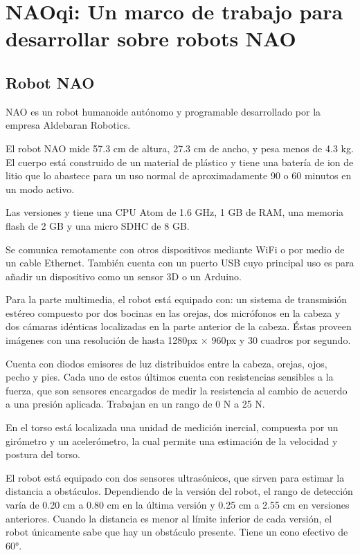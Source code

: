 \section{NAOqi: Un marco de trabajo para desarrollar sobre robots NAO}
\label{\detokenize{chapter_one/naoqi:naoqi-un-marco-de-trabajo-para-desarrollar-sobre-robots-nao}}\label{\detokenize{chapter_one/naoqi::doc}}


\subsection{Robot NAO}
\label{\detokenize{chapter_one/naoqi:nao}}
NAO es un robot humanoide autónomo y programable desarrollado por la empresa Aldebaran Robotics.

El robot NAO mide 57.3 cm de altura, 27.3 cm de ancho, y pesa menos de 4.3 kg.
El cuerpo está construido de un material de plástico y tiene una batería de ion
de litio que lo abastece para un uso normal de aproximadamente
90 o 60 minutos en un modo activo.

Las versiones  y  tiene una CPU Atom de 1.6 GHz, 1 GB de RAM, una
memoria flash de 2 GB y una micro SDHC de 8 GB.

Se comunica remotamente con otros dispositivos mediante WiFi o por medio de un
cable Ethernet. También cuenta con un puerto USB cuyo principal uso es para
añadir un dispositivo como un sensor 3D o un Arduino.

Para la parte multimedia, el robot está equipado con: un sistema de transmisión
estéreo compuesto por dos bocinas en las orejas, dos micrófonos en la cabeza
y dos cámaras idénticas
localizadas en la parte anterior de la cabeza. Éstas proveen imágenes con una
resolución de hasta 1280px $\times$ 960px y 30 cuadros por segundo.

Cuenta con diodos emisores de luz distribuidos entre la cabeza, orejas, ojos, pecho y pies. Cada
uno de estos últimos cuenta con resistencias sensibles a la fuerza, que son
sensores encargados de medir la resistencia al cambio de acuerdo a una presión
aplicada. Trabajan en un rango de 0 N a 25 N.

En el torso está localizada una unidad de medición inercial, compuesta por un
girómetro y un acelerómetro, la cual permite una estimación de la velocidad
y postura del torso.

El robot está equipado con dos sensores ultrasónicos, que sirven para estimar
la distancia a obstáculos. Dependiendo de la versión del robot, el rango de
detección varía de 0.20 cm a 0.80 cm en la última versión y 0.25 cm a 2.55 cm
en versiones anteriores. Cuando la distancia es menor al límite inferior de
cada versión, el robot únicamente sabe que hay un obstáculo presente.
Tiene un cono efectivo de 60°.

